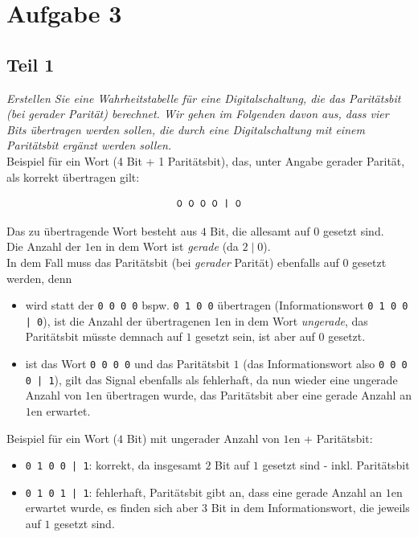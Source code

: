 \chapter{Aufgabe 3}

\section{Teil 1}

\textit{Erstellen Sie eine Wahrheitstabelle für eine Digitalschaltung, die das Paritätsbit (bei gerader Parität) berechnet.
Wir gehen im Folgenden davon aus, dass vier Bits übertragen werden sollen, die durch eine Digitalschaltung mit einem Paritätsbit ergänzt werden sollen.} \\

\noindent
Beispiel für ein Wort (4 Bit + 1 Paritätsbit), das, unter Angabe gerader Parität, als korrekt übertragen gilt:

\begin{equation}\notag
\texttt{0 0 0 0 | 0}
\end{equation}

\noindent
Das zu übertragende Wort besteht aus $4$ Bit, die allesamt auf $0$ gesetzt sind.\\
Die Anzahl der $1$en in dem Wort ist \textit{gerade} (da $2 \mid 0$).\\
In dem Fall muss das Paritätsbit (bei \textit{gerader} Parität) ebenfalls auf $0$ gesetzt werden, denn

\begin{itemize}
    \itemsep0.5em
    \item wird statt der \texttt{0 0 0 0} bspw. \texttt{0 1 0 0} übertragen (Informationswort \texttt{0 1 0 0 | 0}), ist die Anzahl der übertragenen $1$en in dem Wort \textit{ungerade}, das Paritätsbit müsste demnach auf $1$ gesetzt sein, ist aber auf $0$ gesetzt.
    \item ist das Wort \texttt{0 0 0 0} und das Paritätsbit $1$ (das Informationswort also \texttt{0 0 0 0 | 1}), gilt das Signal ebenfalls als fehlerhaft, da nun wieder eine ungerade Anzahl von $1$en übertragen wurde, das Paritätsbit aber eine gerade Anzahl an $1$en erwartet.
\end{itemize}

\noindent
Beispiel für ein Wort ($4$ Bit) mit ungerader Anzahl von $1$en + Paritätsbit:

\begin{itemize}
    \itemsep0.5em
    \item \texttt{0 1 0 0 | 1}: korrekt, da insgesamt $2$ Bit auf $1$ gesetzt sind - inkl. Paritätsbit
    \item \texttt{0 1 0 1 | 1}: fehlerhaft, Paritätsbit gibt an, dass eine gerade Anzahl an $1$en erwartet wurde, es finden sich aber $3$ Bit in dem Informationswort, die jeweils auf $1$ gesetzt sind.
\end{itemize}

